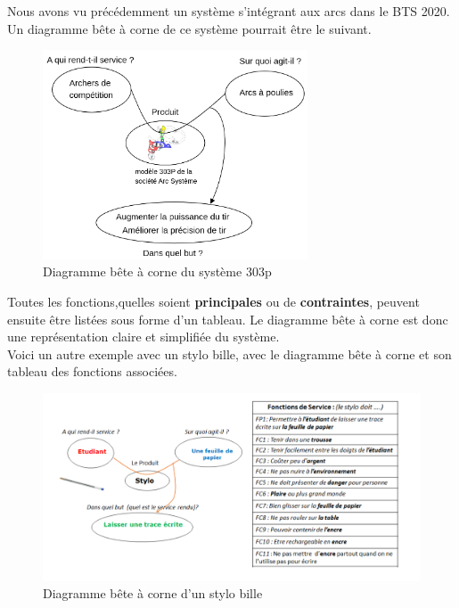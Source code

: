 \documentclass[
	11pt, %
	fleqn, %
	a4paper, %
]{LegrandOrangeBook}
\begin{document}
Nous avons vu précédemment un système s'intégrant aux arcs dans le BTS 2020. Un diagramme bête à corne de ce système pourrait être le suivant.


\begin{figure}[H] %
	\centering %
	\includegraphics[width=0.7\textwidth]{Images/bete1.png} %
	\caption{Diagramme bête à corne du système 303p}
	\label{bete1} %
\end{figure}

Toutes les fonctions,quelles soient \textbf{principales} ou de \textbf{contraintes}, peuvent ensuite être listées sous forme d'un tableau. Le diagramme bête à corne est donc une représentation claire et simplifiée du système.\\

Voici un autre exemple avec un stylo bille, avec le diagramme bête à corne et son tableau des fonctions associées.
\begin{figure}[H] %
	\centering %
	\includegraphics[width=1\textwidth]{Images/stylo3.png} %
	\caption{Diagramme bête à corne d'un stylo bille}
	\label{stylo} %
\end{figure}
\end{document}
